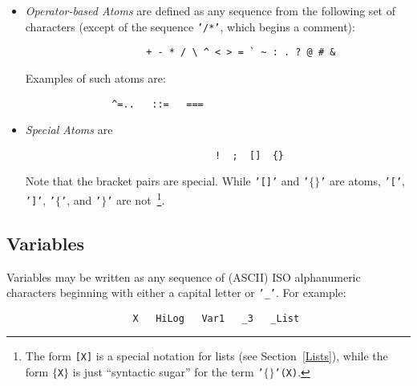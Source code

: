 \begin{itemize}
\begin{itemize}
\begin{itemize}
\item Octal escapes of the form \verb|\nnn\|, where {\tt nnn} is the octal number corresponding to an ASCII code.  E.g., 
\begin{verbatim}
                        | ?- write('\60\').
                        0
\end{verbatim}
\item Hexidecimal escapes of the form \verb|\xnn|, where {\tt nn} is
  the hexidecimal number corresponding to an ASCII code~\footnote{The
    current version of XSB differs from the ISO specification in that
    hexidecimal escapes do not have a trailing slash.}.  .  E.g.,
\begin{verbatim}
                        | ?- write('\30\').
                        0
\end{verbatim}
\end{itemize}
\item UTF-8 escape sequences have the form \verb|\unnnn| where {\em
  nnnn} is the hexidecimal number corresponding to a UTF-8 codepoint.  
\end{itemize}
\item {\em Operator-based Atoms} are defined as any sequence from the following set
  of characters (except of the sequence {\tt '/*'}, which begins a
  comment):
      \begin{verbatim}
                     + - * / \ ^ < > = ` ~ : . ? @ # &
      \end{verbatim}
Examples of such atoms are:
\begin{verbatim}
               ^=..   ::=   ===
\end{verbatim}

\item {\em Special Atoms} are
      \begin{verbatim}
                                 !  ;  []  {}
      \end{verbatim}
      Note that the bracket pairs are special. While {\tt '[]'} and
      {\tt '$\{\}$'} are atoms, {\tt '['}, {\tt ']'}, {\tt '$\{$'},
      and {\tt '$\}$'} are not~\footnote{The form {\tt [X]} is a
        special notation for lists (see Section~\ref{Lists}), while
        the form {\tt $\{$X$\}$} is just ``syntactic sugar'' for the
        term {\tt '$\{\}$'(X)}.}.
\end{itemize}



\subsection{Variables}
Variables may be written as any sequence of (ASCII) ISO alphanumeric
characters  beginning with either a capital
letter or {\tt '\_'}.  For example:
\begin{verbatim}
                      X   HiLog   Var1   _3   _List
\end{verbatim}

